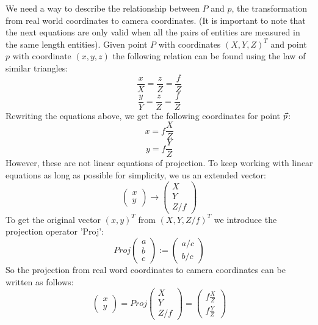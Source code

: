 We need a way to describe the relationship between $P$ and $p$, the transformation from real world coordinates to camera coordinates. (It is important to note that the next equations are only valid when all the pairs of entities are measured in the same length entities). Given point $P$ with coordinates $(X, Y, Z)^T$ and point $p$ with coordinate $(x, y, z)$ the following relation can be found using the law of similar triangles: 
\begin{equation}
    \frac{x}{X} = \frac{z}{Z} = \frac{f}{Z}
\end{equation}
\begin{equation}
    \frac{y}{Y} = \frac{z}{Z} = \frac{f}{Z}
\end{equation}
Rewriting the equations above, we get the following coordinates for point $\vec p$:
\begin{equation}
    x = f\frac{X}{Z}
\end{equation}
\begin{equation}
    y = f\frac{Y}{Z}
\end{equation}
However, these are not linear equations of projection. To keep working with linear equations as long as possible for simplicity, we us an extended vector: 
\begin{equation}\label{eq:exvec}
    \begin{pmatrix}
        x \\ y
    \end{pmatrix} \rightarrow 
    \begin{pmatrix}
        X \\ Y \\ Z/f
    \end{pmatrix}
\end{equation}
To get the original vector $(x, y)^T$ from $(X, Y, Z/f)^T$ we introduce the projection operator 'Proj':
\begin{equation}
    Proj\begin{pmatrix}
        a \\ b \\ c
    \end{pmatrix} :=
    \begin{pmatrix}
        a/c \\ b/c
    \end{pmatrix}
\end{equation}
So the projection from real word coordinates to camera coordinates can be written as follows:
\begin{equation}\label{eq:projection}
    \begin{pmatrix}
        x \\ y
    \end{pmatrix} = Proj
    \begin{pmatrix}
        X \\ Y \\ Z/f
    \end{pmatrix} = 
    \begin{pmatrix}
        f\frac{X}{Z} \\[0.25cm] f\frac{Y}{Z}
    \end{pmatrix}
\end{equation}
